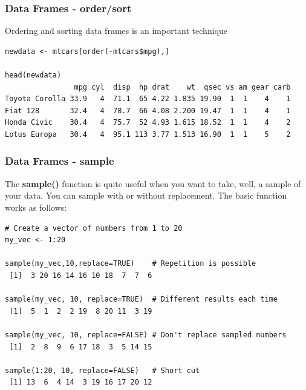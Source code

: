 \documentclass{beamer}
\begin{document}
\begin{frame}[fragile]
\frametitle{Data Frames - order/sort}
Ordering and sorting data frames is an important technique 
\footnotesize
\begin{verbatim}
newdata <- mtcars[order(-mtcars$mpg),]

head(newdata)
                mpg cyl  disp  hp drat    wt  qsec vs am gear carb
Toyota Corolla 33.9   4  71.1  65 4.22 1.835 19.90  1  1    4    1
Fiat 128       32.4   4  78.7  66 4.08 2.200 19.47  1  1    4    1
Honda Civic    30.4   4  75.7  52 4.93 1.615 18.52  1  1    4    2
Lotus Europa   30.4   4  95.1 113 3.77 1.513 16.90  1  1    5    2

\end{verbatim}
\end{frame}

\begin{frame}[fragile]
\frametitle{Data Frames - sample}
The \textbf{sample()} function is quite useful when you want to take, well, a sample of your data. You can sample with or without replacement. The basic function works as follows: 
\footnotesize
\begin{verbatim}
# Create a vector of numbers from 1 to 20
my_vec <- 1:20

sample(my_vec,10,replace=TRUE)    # Repetition is possible
 [1]  3 20 16 14 16 10 18  7  7  6

sample(my_vec, 10, replace=TRUE)  # Different results each time
 [1]  5  1  2  2 19  8 20 11  3 19

sample(my_vec, 10, replace=FALSE) # Don't replace sampled numbers
 [1]  2  8  9  6 17 18  3  5 14 15

sample(1:20, 10, replace=FALSE)   # Short cut
 [1] 13  6  4 14  3 19 16 17 20 12

\end{verbatim}
\end{frame}
\end{document}
